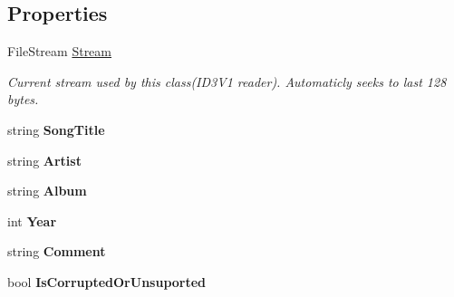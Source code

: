 \subsection*{Properties}
\begin{DoxyCompactItemize}
\item 
File\+Stream \mbox{\hyperlink{classOSML_1_1Media_1_1Metadata_1_1ID3_1_1ID3V1_ab7592858c878b44cbefa12b86dd91375}{Stream}}
\begin{DoxyCompactList}\small\item\em Current stream used by this class(\+I\+D3\+V1 reader). Automaticly seeks to last 128 bytes. \end{DoxyCompactList}\item 
\mbox{\label{classOSML_1_1Media_1_1Metadata_1_1ID3_1_1ID3V1_a33fbe6f9b891541f01495081bc0206be}} 
string {\bfseries Song\+Title}
\item 
\mbox{\label{classOSML_1_1Media_1_1Metadata_1_1ID3_1_1ID3V1_a17368f559339197130a2139ec09f12cf}} 
string {\bfseries Artist}
\item 
\mbox{\label{classOSML_1_1Media_1_1Metadata_1_1ID3_1_1ID3V1_a587a2a0a3b26effcb688c4b64b5a7f0d}} 
string {\bfseries Album}
\item 
\mbox{\label{classOSML_1_1Media_1_1Metadata_1_1ID3_1_1ID3V1_a6e153327f35047f2b4924c8e9e10cde4}} 
int {\bfseries Year}
\item 
\mbox{\label{classOSML_1_1Media_1_1Metadata_1_1ID3_1_1ID3V1_acda997258be55e492622e8ed7d5b34ac}} 
string {\bfseries Comment}
\item 
\mbox{\label{classOSML_1_1Media_1_1Metadata_1_1ID3_1_1ID3V1_a6ff40e999c0819eadd5dc6771b7dbb89}} 
bool {\bfseries Is\+Corrupted\+Or\+Unsuported}
\end{DoxyCompactItemize}


